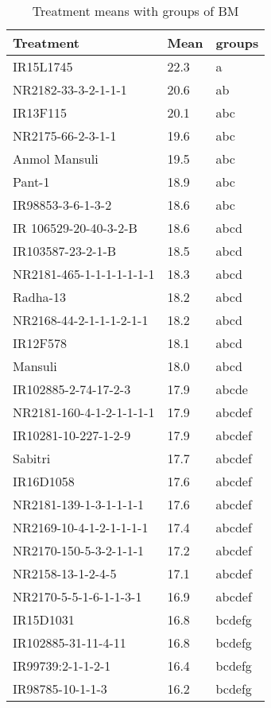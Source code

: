 \documentclass[]{article}
\begin{document}
\begin{longtable}{lll}
\caption{\label{tab:two-fac-groups-tab1}Treatment means with groups of BM}\\
\toprule
Treatment & Mean & groups\\
\midrule
\rowcolor{gray!6}  IR15L1745 & 22.3 & a\\
NR2182-33-3-2-1-1-1 & 20.6 & ab\\
\rowcolor{gray!6}  IR13F115 & 20.1 & abc\\
NR2175-66-2-3-1-1 & 19.6 & abc\\
\rowcolor{gray!6}  Anmol Mansuli & 19.5 & abc\\
\addlinespace
Pant-1 & 18.9 & abc\\
\rowcolor{gray!6}  IR98853-3-6-1-3-2 & 18.6 & abc\\
IR 106529-20-40-3-2-B & 18.6 & abcd\\
\rowcolor{gray!6}  IR103587-23-2-1-B & 18.5 & abcd\\
NR2181-465-1-1-1-1-1-1-1 & 18.3 & abcd\\
\addlinespace
\rowcolor{gray!6}  Radha-13 & 18.2 & abcd\\
NR2168-44-2-1-1-1-2-1-1 & 18.2 & abcd\\
\rowcolor{gray!6}  IR12F578 & 18.1 & abcd\\
Mansuli & 18.0 & abcd\\
\rowcolor{gray!6}  IR102885-2-74-17-2-3 & 17.9 & abcde\\
\addlinespace
NR2181-160-4-1-2-1-1-1-1 & 17.9 & abcdef\\
\rowcolor{gray!6}  IR10281-10-227-1-2-9 & 17.9 & abcdef\\
Sabitri & 17.7 & abcdef\\
\rowcolor{gray!6}  IR16D1058 & 17.6 & abcdef\\
NR2181-139-1-3-1-1-1-1 & 17.6 & abcdef\\
\addlinespace
\rowcolor{gray!6}  NR2169-10-4-1-2-1-1-1-1 & 17.4 & abcdef\\
NR2170-150-5-3-2-1-1-1 & 17.2 & abcdef\\
\rowcolor{gray!6}  NR2158-13-1-2-4-5 & 17.1 & abcdef\\
NR2170-5-5-1-6-1-1-3-1 & 16.9 & abcdef\\
\rowcolor{gray!6}  IR15D1031 & 16.8 & bcdefg\\
\addlinespace
IR102885-31-11-4-11 & 16.8 & bcdefg\\
\rowcolor{gray!6}  IR99739:2-1-1-2-1 & 16.4 & bcdefg\\
IR98785-10-1-1-3 & 16.2 & bcdefg\\

\end{longtable}
\end{document}
